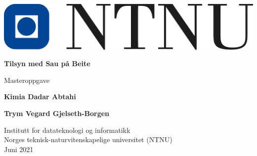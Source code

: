 \begin{titlingpage}
    \begin{center}
        \vspace*{1cm}
        \begin{center}
            \includegraphics[scale=0.5]{Figurer/Bilder/ntnu_uten_slagord.png}
        \end{center}
        \vspace*{2cm}
        \huge
        \textbf{Tilsyn med Sau på Beite}
            
        \vspace{0.5cm}
        \large
        Masteroppgave
            
        \vspace{1.5cm}
        \begin{center}
            \textbf{Kimia Dadar Abtahi} 
        \end{center}
        \begin{center}
            \textbf{Trym Vegard Gjelseth-Borgen}
        \end{center}

        \vspace{3cm}

        \Large
        \vspace{2cm}
        Institutt for datateknologi og informatikk\\
        Norges teknisk-naturvitenskapelige universitet (NTNU)\\
        Juni 2021            
    \end{center}
\end{titlingpage}